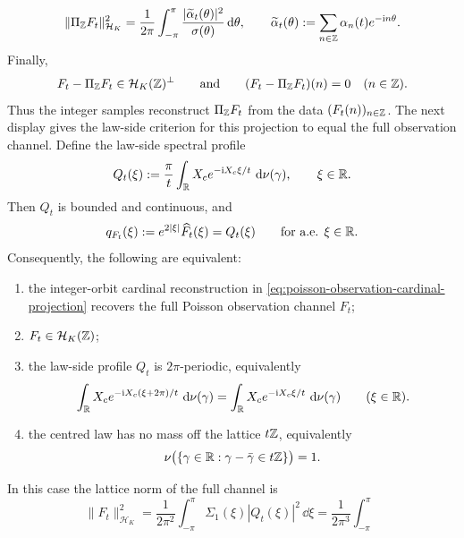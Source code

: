 \begin{theorem}
\begin{equation}
\|\Pi_{\mathbb{Z}}F_t\|_{\mathcal H_K}^2
=\frac1{2\pi}\int_{-\pi}^{\pi}
\frac{|\widetilde\alpha_t(\theta)|^2}{\sigma(\theta)}\,\mathrm{d}\theta,
\qquad
\widetilde\alpha_t(\theta):=
\sum_{n\in\mathbb{Z}}\alpha_n(t)e^{-\mathrm{i} n\theta}.
\end{equation}
Finally,
\[
F_t-\Pi_{\mathbb{Z}}F_t\in\mathcal H_K(\mathbb{Z})^\perp
\qquad\text{and}\qquad
(F_t-\Pi_{\mathbb{Z}}F_t)(n)=0\quad(n\in\mathbb{Z}).
\]
Thus the integer samples reconstruct $\Pi_{\mathbb{Z}}F_t$ from the data
$(F_t(n))_{n\in\mathbb{Z}}$.  The next display gives the law-side criterion for this
projection to equal the full observation channel.
Define the law-side spectral profile
\begin{equation}\label{eq:poisson-law-side-profile}
Q_t(\xi)
:=\frac{\pi}{t}\int_{\mathbb{R}}X_c
e^{-\mathrm{i} X_c\xi/t}\,\,\mathrm{d}\nu(\gamma),
\qquad \xi\in\mathbb{R} .
\end{equation}
Then $Q_t$ is bounded and continuous, and
\begin{equation}\label{eq:poisson-law-side-q-profile}
q_{F_t}(\xi):=e^{2|\xi|}\widehat F_t(\xi)=Q_t(\xi)
\qquad\text{for a.e. }\xi\in\mathbb{R} .
\end{equation}
Consequently, the following are equivalent:
\begin{enumerate}[label=(\roman*)]
\item the integer-orbit cardinal reconstruction in
      \eqref{eq:poisson-observation-cardinal-projection} recovers the full
      Poisson observation channel $F_t$;
\item $F_t\in\mathcal H_K(\mathbb{Z})$;
\item the law-side profile $Q_t$ is $2\pi$-periodic, equivalently
      \begin{equation}\label{eq:poisson-law-side-periodicity}
      \int_{\mathbb{R}}X_c e^{-\mathrm{i} X_c(\xi+2\pi)/t}\,\,\mathrm{d}\nu(\gamma)
      =
      \int_{\mathbb{R}}X_c e^{-\mathrm{i} X_c\xi/t}\,\,\mathrm{d}\nu(\gamma)
      \qquad(\xi\in\mathbb{R}).
      \end{equation}
\item the centred law has no mass off the lattice $t\mathbb{Z}$, equivalently
      \begin{equation}\label{eq:poisson-law-side-lattice-support}
      \nu\bigl(\{\gamma\in\mathbb{R}:\gamma-\bar{\gamma}\in t\mathbb{Z}\}\bigr)=1 .
      \end{equation}
\end{enumerate}
In this case the lattice norm of the full channel is
\begin{equation}\label{eq:poisson-law-side-lattice-norm}
\|F_t\|_{\mathcal H_K}^2
=\frac{1}{2\pi^2}\int_{-\pi}^{\pi}
\Sigma_1(\xi)|Q_t(\xi)|^2\,\dd\xi
=\frac{1}{2\pi^3}\int_{-\pi}^{\pi}

\end{equation}
\end{theorem}

